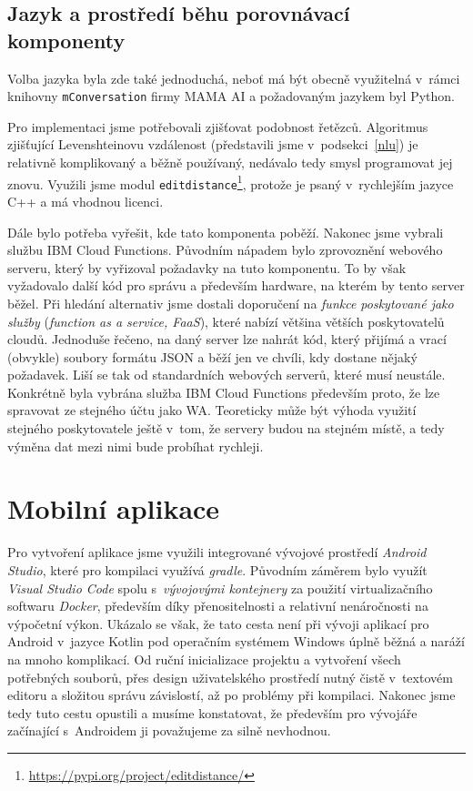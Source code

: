 \subsection{Jazyk a prostředí běhu porovnávací komponenty}

Volba jazyka byla zde také jednoduchá, neboť má být obecně využitelná v~rámci
knihovny \texttt{mConversation} firmy MAMA AI a požadovaným jazykem byl Python.

Pro implementaci jsme potřebovali zjišťovat podobnost řetězců. Algoritmus
zjišťující Levenshteinovu vzdálenost (představili jsme v~podsekci~\ref{nlu})
je relativně komplikovaný a běžně používaný, nedávalo tedy
smysl programovat jej znovu. Využili jsme modul
\texttt{editdistance}\footnote{\url{https://pypi.org/project/editdistance/}},
protože je psaný v~rychlejším jazyce C++ a má vhodnou licenci.

Dále bylo potřeba vyřešit, kde tato komponenta poběží. Nakonec jsme vybrali
službu IBM Cloud Functions. Původním nápadem bylo
zprovoznění webového serveru, který by vyřizoval požadavky na tuto komponentu.
To by však vyžadovalo další kód pro správu a především hardware, na kterém by
tento server běžel. Při hledání alternativ jsme dostali doporučení na
\textit{funkce poskytované jako služby} (\textit{function as a service, FaaS}),
které nabízí většina větších poskytovatelů cloudů. Jednoduše řečeno, na daný
server lze nahrát kód, který přijímá a vrací (obvykle) soubory formátu JSON a
běží jen ve chvíli, kdy dostane nějaký požadavek. Liší se tak od standardních
webových serverů, které musí  neustále. Konkrétně byla vybrána
služba IBM Cloud Functions především proto, že lze spravovat ze stejného účtu jako
WA. Teoreticky může být výhoda využití stejného poskytovatele ještě v~tom, že
servery budou na stejném místě, a tedy výměna dat mezi nimi bude probíhat rychleji.

\section{Mobilní aplikace}\label{app}

Pro vytvoření aplikace jsme využili integrované vývojové prostředí
\textit{Android Studio}, které pro kompilaci využívá \textit{gradle}.
Původním záměrem bylo využít \textit{Visual Studio Code}
spolu s~\textit{vývojovými kontejnery} za použití virtualizačního softwaru
\textit{Docker}, především díky přenositelnosti a relativní nenáročnosti
na výpočetní výkon. Ukázalo se však, že tato cesta není při vývoji aplikací
pro Android v~jazyce Kotlin pod operačním systémem Windows úplně běžná a
naráží na mnoho komplikací. Od ruční inicializace projektu a vytvoření všech
potřebných souborů, přes design uživatelského
prostředí nutný čistě v~textovém editoru a složitou správu závislostí,
až po problémy při kompilaci. Nakonec jsme tedy tuto cestu opustili a
musíme konstatovat, že především pro vývojáře začínající s~Androidem
ji považujeme za silně nevhodnou.

